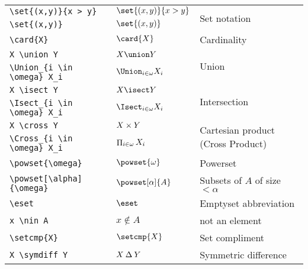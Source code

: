 \documentclass[leqno,11pt]{amsart}
\begin{document}
\begin{tabular}{l |  l | l}\toprule
	\verb=\set{(x,y)}{x > y}=	  &    \(   \set{(x,y)}{x > y} \)    & \multirow{2}{*}{Set notation}  \\[6pt]
	\verb=\set{(x,y)}=			  & 	\(   \set{(x,y)}      \)    &  \\ \midrule
	\verb=\card{X}=                          &    \(   \card{X}                   \)    & Cardinality \\ \midrule
	\verb=X \union Y=                        &    \(   X \union Y                 \)    & \multirow{2}{*}{Union}  \\[6pt]
	\verb=\Union_{i \in \omega} X_i=         &    \(   \Union_{i \in \omega} X_i  \)    &  \\ \midrule
	\verb=X \isect Y=                        &    \(   X \isect Y                 \)    & \multirow{2}{*}{Intersection} \\[6pt]
	\verb=\Isect_{i \in \omega} X_i=         &    \(   \Isect_{i \in \omega} X_i  \)    &  \\ \midrule
	\verb=X \cross Y=                        &    \(   X \mathbin{\times} Y                 \)    & \multirow{2}{*}{Cartesian product (Cross Product)} \\[6pt]
	\verb=\Cross_{i \in \omega} X_i=         &    \(   \mathop{\Pi}_{i \in \omega} X_i  \)    &  \\ \midrule
	\verb=\powset{\omega}=                   &    \(   \powset{\omega}            \)    &   Powerset \\  \midrule
	\verb=\powset[\alpha]{\omega}= 			 &    \(   \powset[\alpha]{A}    \)    & Subsets of \( A \) of  size \( < \alpha \)  \\
	\verb=\eset=                             &    \(   \eset                      \)    &  Emptyset abbreviation\\ \midrule
	\verb=x \nin A=                          &    \(   x \nin A                   \)    &  not an element\\ \midrule
	\verb=\setcmp{X}=                        &    \(   \setcmp{X}                 \)    &  Set compliment\\\midrule
	\verb=X \symdiff Y=                      &    \(   X \mathbin{\Delta} Y               \)    & Symmetric difference \\ \bottomrule
		\bottomrule
	\end{tabular}          \\
\end{document}
